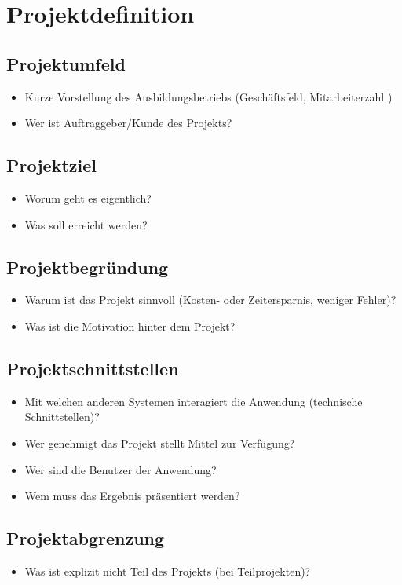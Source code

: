 \section{Projektdefinition}
\label{sec:Einleitung}


\subsection{Projektumfeld} 
\label{sec:Projektumfeld}
\begin{itemize}
	\item Kurze Vorstellung des Ausbildungsbetriebs (Geschäftsfeld, Mitarbeiterzahl \usw)
	\item Wer ist Auftraggeber/Kunde des Projekts?
\end{itemize}


\subsection{Projektziel} 
\label{sec:Projektziel}
\begin{itemize}
	\item Worum geht es eigentlich?
	\item Was soll erreicht werden?
\end{itemize}


\subsection{Projektbegründung} 
\label{sec:Projektbegruendung}
\begin{itemize}
	\item Warum ist das Projekt sinnvoll (\zB Kosten- oder Zeitersparnis, weniger Fehler)?
	\item Was ist die Motivation hinter dem Projekt?
\end{itemize}


\subsection{Projektschnittstellen} 
\label{sec:Projektschnittstellen}
\begin{itemize}
	\item Mit welchen anderen Systemen interagiert die Anwendung (technische Schnittstellen)?
	\item Wer genehmigt das Projekt \bzw stellt Mittel zur Verfügung? 
	\item Wer sind die Benutzer der Anwendung?
	\item Wem muss das Ergebnis präsentiert werden?
\end{itemize}


\subsection{Projektabgrenzung} 
\label{sec:Projektabgrenzung}
\begin{itemize}
	\item Was ist explizit nicht Teil des Projekts (\insb bei Teilprojekten)?
\end{itemize}
